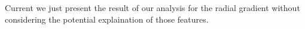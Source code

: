 Current we just present the result of our analysis for the radial gradient without considering the potential explaination of those features. 











%
